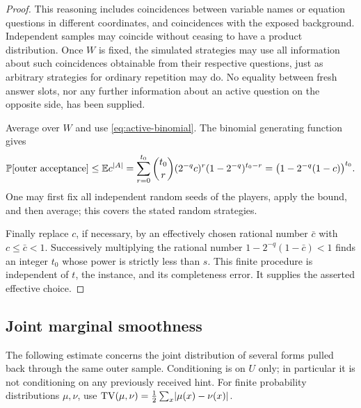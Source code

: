 \begin{proof}
This reasoning includes coincidences between variable names or equation
questions in different coordinates, and coincidences with the exposed
background. Independent samples may coincide without ceasing to have a
product distribution. Once $W$ is fixed, the simulated strategies may use
all information about such coincidences obtainable from their respective
questions, just as arbitrary strategies for ordinary repetition may do.
No equality between fresh answer slots, nor any further information about
an active question on the opposite side, has been supplied.

Average over $W$ and use \eqref{eq:active-binomial}. The binomial generating
function gives
\[
 \mathbb P[\text{outer acceptance}]
 \le\mathbb E c^{|A|}
 =\sum_{r=0}^{t_0}\binom{t_0}{r}(2^{-q}c)^r
                       (1-2^{-q})^{t_0-r}
 =\bigl(1-2^{-q}(1-c)\bigr)^{t_0}.
\]
One may first fix all independent random seeds of the players, apply the
bound, and then average; this covers the stated random strategies.

Finally replace $c$, if necessary, by an effectively chosen rational
number $\bar c$ with $c\le\bar c<1$. Successively multiplying the rational
number $1-2^{-q}(1-\bar c)<1$ finds an integer $t_0$ whose power is strictly
less than $s$. This finite procedure is independent of $t$, the instance,
and its completeness error. It supplies the asserted effective choice.
\end{proof}

\subsection{Joint marginal smoothness}

The following estimate concerns the joint distribution of several forms
pulled back through the same outer sample. Conditioning is on $U$ only;
in particular it is not conditioning on any previously received hint.
For finite probability distributions $\mu,\nu$, use
$\operatorname{TV}(\mu,\nu)=\frac12\sum_x\lvert\mu(x)-\nu(x)\rvert$.

